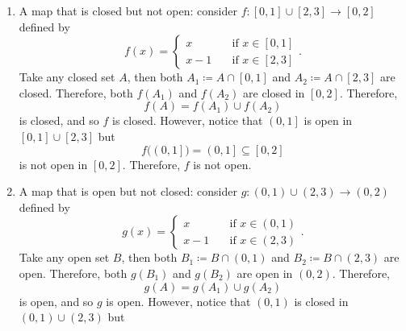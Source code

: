 \documentclass[math]{amznotes}
\theoremstyle{remark}
\begin{document}
\begin{enumerate}
    \item A map that is closed but not open: consider $f \colon \left[0, 1\right] \cup \left[2, 3\right] \to \left[0, 2\right]$ defined by 
    \begin{equation*}
        f\left(x\right) = \begin{cases}
            x & \quad\textrm{if } x \in \left[0, 1\right] \\
            x - 1 & \quad\textrm{if } x \in \left[2, 3\right]
        \end{cases}.
    \end{equation*}
    Take any closed set $A$, then both $A_1 \coloneqq A \cap \left[0, 1\right]$ and $A_2 \coloneqq A \cap \left[2, 3\right]$ are closed. Therefore, both $f\left(A_1\right)$ and $f\left(A_2\right)$ are closed in $\left[0, 2\right]$. Therefore, 
    \begin{equation*}
        f\left(A\right) = f\left(A_1\right) \cup f\left(A_2\right)
    \end{equation*}
    is closed, and so $f$ is closed. However, notice that $\left(0, 1\right]$ is open in $\left[0, 1\right] \cup \left[2, 3\right]$ but 
    \begin{equation*}
        f\bigl(\left(0, 1\right]\bigr) = \left(0, 1\right] \subseteq \left[0, 2\right]
    \end{equation*}
    is not open in $\left[0, 2\right]$. Therefore, $f$ is not open.
    \item A map that is open but not closed: consider $g \colon \left(0, 1\right) \cup \left(2, 3\right) \to \left(0, 2\right)$ defined by 
    \begin{equation*}
        g\left(x\right) = \begin{cases}
            x & \quad\textrm{if } x \in \left(0, 1\right) \\
            x - 1 & \quad\textrm{if } x \in \left(2, 3\right)
        \end{cases}.
    \end{equation*}
    Take any open set $B$, then both $B_1 \coloneqq B \cap \left(0, 1\right)$ and $B_2 \coloneqq B \cap \left(2, 3\right)$ are open. Therefore, both $g\left(B_1\right)$ and $g\left(B_2\right)$ are open in $\left(0, 2\right)$. Therefore, 
    \begin{equation*}
        g\left(A\right) = g\left(A_1\right) \cup g\left(A_2\right)
    \end{equation*}
    is open, and so $g$ is open. However, notice that $\left(0, 1\right)$ is closed in $\left(0, 1\right) \cup \left(2, 3\right)$ but 

\end{enumerate}
\end{document}
